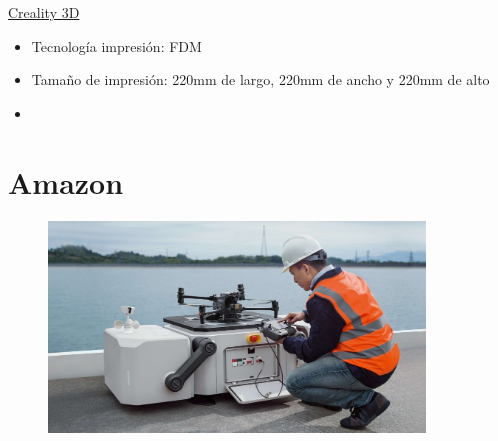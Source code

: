 \documentclass{article}
\begin{document}
\href{https://www.mercadolibre.com.mx/impresora-creality-3d-ender-3-color-black-100v265v-con-tecnologia-de-impresion-fdm/p/MLM12634791?pdp_filters=category:MLM182235#searchVariation=MLM12634791&position=2&search_layout=stack&type=product&tracking_id=86ef7de0-2a99-497d-b9c2-f1520615ea91}{Creality 3D}

\begin{itemize}
\item Tecnología impresión: FDM
\item Tamaño de impresión: 220mm de largo, 220mm de ancho y 220mm de alto
\item  
\end{itemize}



\section{Amazon} %

\begin{figure}[h]
\includegraphics[width=10cm]{pictures/drone_box.jpg}
\centering
\end{figure}
\end{document}
